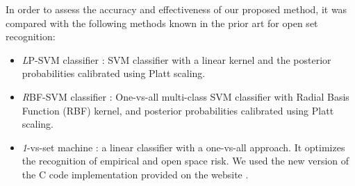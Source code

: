 \documentclass{ieeeaccess}
\begin{document}
In order to assess the accuracy and effectiveness of our proposed method, it was compared with the following methods known in the prior art for open set recognition:
\begin{itemize}	
	\item \emph LP-SVM classifier \cite{36}: SVM classifier with a linear kernel and the posterior probabilities calibrated using Platt scaling.
	\item \emph RBF-SVM classifier \cite{19}: One-vs-all multi-class SVM classifier with Radial Basis Function (RBF) kernel, and posterior probabilities calibrated using Platt scaling.
	\item \emph 1-vs-set machine \cite{2}: a linear classifier with a one-vs-all approach. It optimizes the recognition of empirical and open space risk. We used the new version of the C code implementation provided on the website \cite{39}.
\end{itemize}
\end{document}
